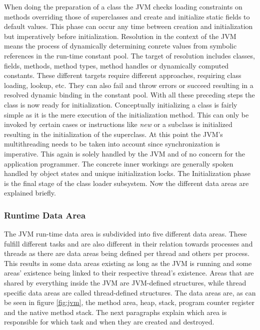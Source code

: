 When doing the preparation of a class the JVM checks loading constraints on methods overriding those of superclasses and create and initialize static fields to default values. This phase can occur any time between creation and initialization but imperatively before initialization. Resolution in the context of the JVM means the process of dynamically determining conrete values from symbolic references in the run-time constant pool. The target of resolution includes classes, fields, methods, method types, method handles or dynamically computed constants. These different targets require different approaches, requiring class loading, lookup, etc. They can also fail and throw errors or succeed resulting in a resolved dynamic binding in the constant pool. With all these preceding steps the class is now ready for initialization.
Conceptually initializing a class is fairly simple as it is the mere execution of the initialization method. This can only be invoked by certain cases or instructions like \emph{new} or a subclass is initialized resulting in the initialization of the superclass. At this point the JVM's multithreading needs to be taken into account since synchronization is imperative. This again is solely handled by the JVM and of no concern for the application programmer. The concrete inner workings are generally spoken handled by object states and unique initialization locks. The Initialization phase is the final stage of the class loader subsystem. Now the different data areas are explained briefly. \cite{Lindholm}

\subsubsection{Runtime Data Area}

The JVM run-time data area is subdivided into five different data areas. These fulfill different tasks and are also different in their relation towards processes and threads as there are data areas being defined per thread and others per process. This results in some data areas existing as long as the JVM is running and some areas' existence being linked to their respective thread's existence. Areas that are shared by everything inside the JVM are JVM-defined structures, while thread specific data areas are called thread-defined structures. The data areas are, as can be seen in figure \ref{fig:jvm}, the method area, heap, stack, program counter register and the native method stack. The next paragraphs explain which area is responsible for which task and when they are created and destroyed.

